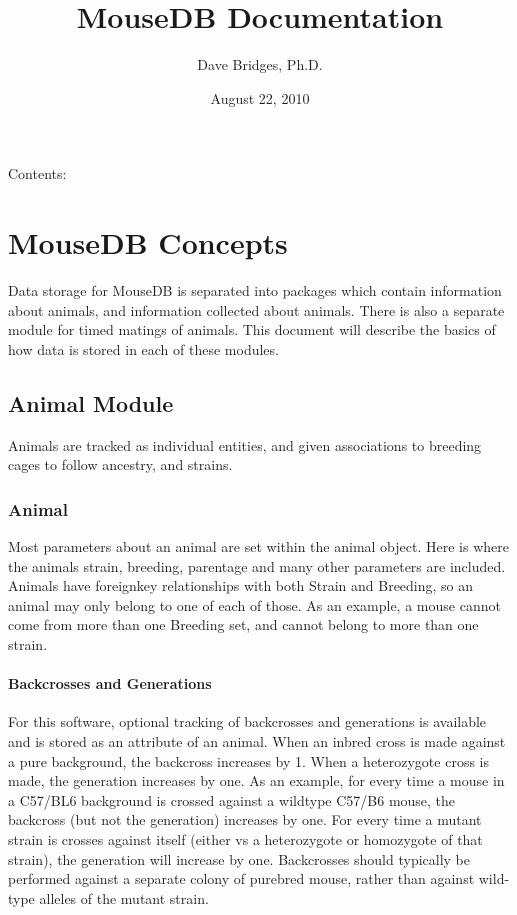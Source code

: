 \documentclass[letterpaper,10pt,english]{sphinxmanual}
\title{MouseDB Documentation}
\date{August 22, 2010}
\author{Dave Bridges, Ph.D.}
\begin{document}
\maketitle
\tableofcontents
{}\label{index::doc}


Contents:


\chapter{MouseDB Concepts}
\label{concepts:welcome-to-mousedb-s-documentation}\label{concepts::doc}\label{concepts:mousedb-concepts}
Data storage for MouseDB is separated into packages which contain information about animals, and information collected about animals.  There is also a separate module for timed matings of animals.  This document will describe the basics of how data is stored in each of these modules.


\section{Animal Module}
\label{concepts:animal-module}
Animals are tracked as individual entities, and given associations to breeding cages to follow ancestry, and strains.


\subsection{Animal}
\label{concepts:animal}
Most parameters about an animal are set within the animal object.  Here is where the animals strain, breeding, parentage and many other parameters are included.  Animals have foreignkey relationships with both Strain and Breeding, so an animal may only belong to one of each of those.  As an example, a mouse cannot come from more than one Breeding set, and cannot belong to more than one strain.


\subsubsection{Backcrosses and Generations}
\label{concepts:backcrosses-and-generations}
For this software, optional tracking of backcrosses and generations is available and is stored as an attribute of an animal.  When an inbred cross is made against a pure background, the backcross increases by 1.  When a heterozygote cross is made, the generation increases by one.  As an example, for every time a mouse in a C57/BL6 background is crossed against a wildtype C57/B6 mouse, the backcross (but not the generation) increases by one.  For every time a mutant strain is crosses against itself (either vs a heterozygote or homozygote of that strain), the generation will increase by one.  Backcrosses should typically be performed against a separate colony of purebred mouse, rather than against wild-type alleles of the mutant strain.
\end{document}
